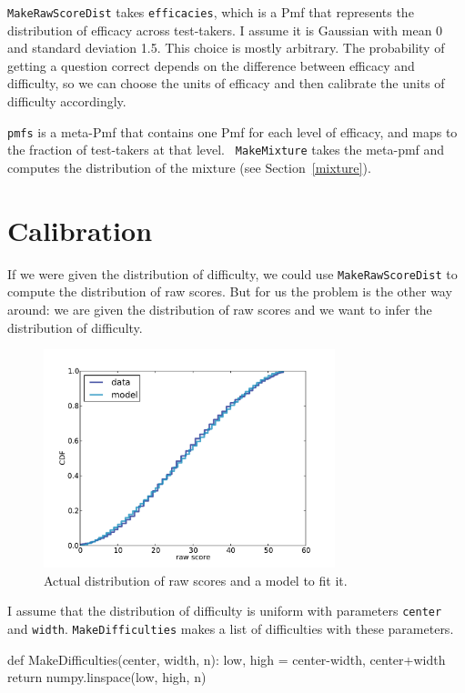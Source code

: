 \documentclass[12pt]{book}
\theoremstyle{exercise}
\begin{document}
{\tt MakeRawScoreDist} takes {\tt efficacies}, which is a Pmf that
represents the distribution of efficacy across test-takers.  I assume
it is Gaussian with mean 0 and standard deviation 1.5.  This
choice is mostly arbitrary.  The probability of getting a question
correct depends on the difference between efficacy and difficulty, so
we can choose the units of efficacy and then calibrate the units of
difficulty accordingly.  

{\tt pmfs} is a meta-Pmf that contains one Pmf for each level of
efficacy, and maps to the fraction of test-takers at that level.  {\tt
  MakeMixture} takes the meta-pmf and computes the distribution of the
mixture (see Section~\ref{mixture}).  


\section{Calibration}

If we were given the distribution of difficulty, we could use
\verb"MakeRawScoreDist" to compute the distribution of raw scores.
But for us the problem is the other way around: we are given the
distribution of raw scores and we want to infer the distribution of
difficulty.

\begin{figure}
\centerline{\includegraphics[height=2.5in]{figs/sat_calibrate.pdf}}
\caption{Actual distribution of raw scores and a model to fit it.}
\label{fig.satcalibrate}
\end{figure}

I assume that the distribution of difficulty is uniform with
parameters {\tt center} and {\tt width}.  {\tt MakeDifficulties}
makes a list of difficulties with these parameters.

\begin{code}
def MakeDifficulties(center, width, n):
    low, high = center-width, center+width
    return numpy.linspace(low, high, n)
\end{code}
\end{document}
